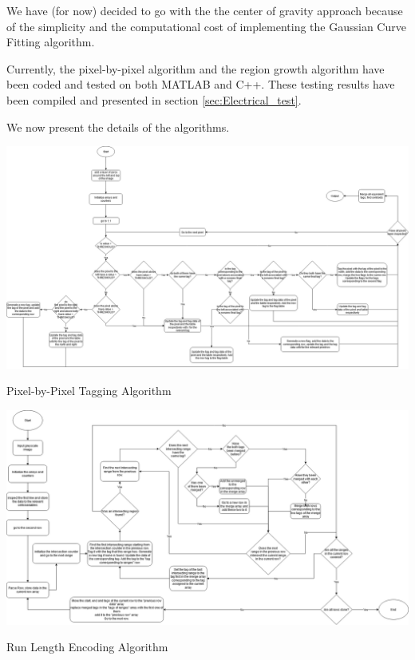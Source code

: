 \documentclass[../../main.tex]{subfiles}
\begin{document}
We have (for now) decided to go with the the center of gravity approach because of the simplicity and the computational cost of implementing the Gaussian Curve Fitting algorithm.

Currently, the pixel-by-pixel algorithm and the region growth algorithm have been coded and tested on both MATLAB and C++. These testing results have been compiled and presented in section \ref{sec:Electrical_test}.

We now present the details of the algorithms.






\begin{Flowchart}
    \centering
    \includegraphics[width=\textwidth]{Figures/Electrical/centroiding_2_non_coding.png}
    \caption{Pixel-by-Pixel Tagging Algorithm}
    \label{FC:pbp_centroiding}
\end{Flowchart}


\begin{Flowchart}
    \centering
    \includegraphics[width = \textwidth]{Figures/Electrical/centroiding_3_non_coding.png}
    \caption{Run Length Encoding Algorithm}
    \label{FC:flow_fe_rle}
\end{Flowchart}
\end{document}
